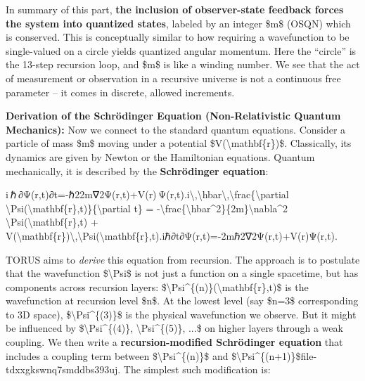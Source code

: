\documentclass[
]{article}
\begin{document}
{In summary of this part, \textbf{the inclusion of observer-state
feedback forces the system into quantized states}, labeled by an integer
\$m\$ (OSQN) which is conserved. This is conceptually similar to how
requiring a wavefunction to be single-valued on a circle yields
quantized angular momentum. Here the ``circle'' is the 13-step recursion
loop, and \$m\$ is like a winding number\hspace{0pt}. We see that the
act of measurement or observation in a recursive universe is not a
continuous free parameter -- it comes in discrete, allowed increments.

\textbf{Derivation of the Schrödinger Equation (Non-Relativistic Quantum
Mechanics):} Now we connect to the standard quantum equations. Consider
a particle of mass \$m\$ moving under a potential
\$V(\textbackslash mathbf\{r\})\$. Classically, its dynamics are given
by Newton or the Hamiltonian equations. Quantum mechanically, it is
described by the \textbf{Schrödinger equation}:

i ℏ ∂Ψ(r,t)∂t=-ℏ22m∇2Ψ(r,t)+V(r) Ψ(r,t).i\textbackslash,\textbackslash hbar\textbackslash,\textbackslash frac\{\textbackslash partial
\textbackslash Psi(\textbackslash mathbf\{r\},t)\}\{\textbackslash partial
t\} =
-\textbackslash frac\{\textbackslash hbar\^{}2\}\{2m\}\textbackslash nabla\^{}2
\textbackslash Psi(\textbackslash mathbf\{r\},t) +
V(\textbackslash mathbf\{r\})\textbackslash,\textbackslash Psi(\textbackslash mathbf\{r\},t).iℏ∂t∂Ψ(r,t)\hspace{0pt}=-2mℏ2\hspace{0pt}∇2Ψ(r,t)+V(r)Ψ(r,t).

TORUS aims to \emph{derive} this equation from recursion. The approach
is to postulate that the wavefunction \$\textbackslash Psi\$ is not just
a function on a single spacetime, but has components across recursion
layers: \$\textbackslash Psi\^{}\{(n)\}(\textbackslash mathbf\{r\},t)\$
is the wavefunction at recursion level \$n\$. At the lowest level (say
\$n=3\$ corresponding to 3D space), \$\textbackslash Psi\^{}\{(3)\}\$ is
the physical wavefunction we observe. But it might be influenced by
\$\textbackslash Psi\^{}\{(4)\}, \textbackslash Psi\^{}\{(5)\}, ...\$ on
higher layers through a weak coupling. We then write a
\textbf{recursion-modified Schrödinger equation} that includes a
coupling term between \$\textbackslash Psi\^{}\{(n)\}\$ and
\$\textbackslash Psi\^{}\{(n+1)\}\$\hspace{0pt}file-tdxxgkswnq7smddbs393uj.
The simplest such modification is:

}
\end{document}
